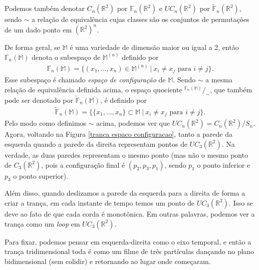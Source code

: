 	\par\vspace{0.3cm} Podemos também denotar $C_n(\mathbb{R}^2)$ por $\mathbb{F}_n(\mathbb{R}^2)$ 
	e $UC_n(\mathbb{R}^2)$ por $\widetilde{\mathbb{F}}_n(\mathbb{R}^2)$, sendo $\sim$ a 
	relação de equivalência cujas classes são os conjuntos de permutações de um dado 
	ponto em $(\mathbb{R}^2)^n$.
	
	\par\vspace{0.3cm} De forma geral, se $\mathbb{M}$ é uma variedade de dimensão maior ou 
	igual a 2, então $\mathbb{F}_n(\mathbb{M})$ denota o subespaço de $\mathbb{M}^{(n)}$ 
	definido por
	\begin{align}
	\label{espaco de configuracao de M}
	    \mathbb{F}_n(\mathbb{M}) 
	    = \{ (x_1, \dots, x_n)\in \mathbb{M}^{(n)} \ | \ x_i\neq x_j \text{ para }i\neq j \}.
	\end{align}
	Esse subespaço é chamado \textit{espaço de configuração} de $\mathbb{M}$. Sendo $\sim$ a mesma 
	relação de equivalência definida acima, o espaço quociente
	$^{\displaystyle{\mathbb{F}_n(\mathbb{M})}}/_{\sim}$, que também 
	pode ser denotado por $\widetilde{\mathbb{F}}_n(\mathbb{M})$, é definido por
	\begin{align}
	\label{espaco de configuracao nao ordenado de M}
	    \widetilde{\mathbb{F}}_n(\mathbb{M}) 
	    = \{ \{ x_1, \dots, x_n\}\subset\mathbb{M} \ | \ x_i\neq x_j \text{ para }i\neq j \}.
	\end{align} 
	Pelo modo como definimos $\sim$ acima, podemos ver que 
	$UC_n(\mathbb{R}^2) = \displaystyle{C_n(\mathbb{R}^2)}/\displaystyle{S_n}$. 
	Agora, voltando na Figura \ref{tranca espaco configuracao}, tanto a parede da esquerda 
	quando a parede da direita representam pontos de $UC_3(\mathbb{R}^2)$. Na verdade, 
	as duas paredes representam o mesmo ponto (mas não o mesmo ponto de $C_3(\mathbb{R}^2)$, 
	pois a configuração final é $(p_2, p_3, p_1)$, sendo $p_1$ o ponto inferior e $p_3$ o ponto superior).
	
	\par\vspace{0.3cm} Além disso, quando deslizamos a parede da esquerda para a direita de forma 
	a criar a trança, em cada instante de tempo temos um ponto de $UC_3(\mathbb{R}^2)$. Isso se 
	deve ao fato de que cada corda é monotônica. Em outras palavras, podemos ver a trança como um
	\textit{loop} em $UC_3(\mathbb{R}^2)$.
	
	\par\vspace{0.3cm} Para fixar, podemos pensar em esquerda-direita como o eixo temporal, 
	e então a trança tridimensional toda é como um filme de três partículas dançando no 
	plano bidimensional (sem colidir) e retornando ao lugar onde começaram.
	
